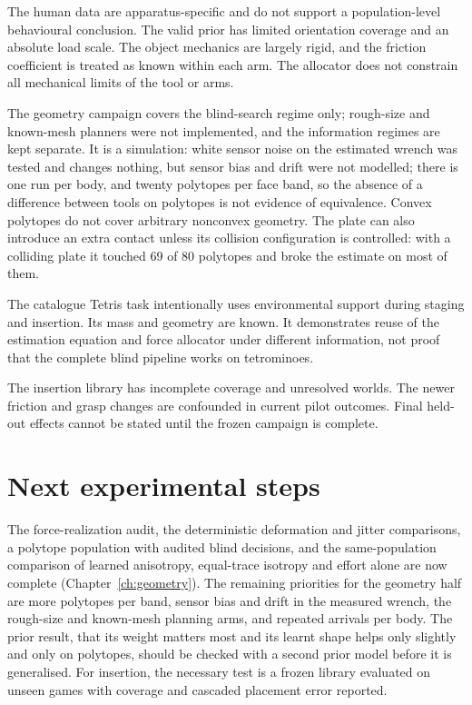 The human data are apparatus-specific and do not support a population-level behavioural conclusion. The valid prior has limited orientation coverage and an absolute load scale. The object mechanics are largely rigid, and the friction coefficient is treated as known within each arm. The allocator does not constrain all mechanical limits of the tool or arms.

The geometry campaign covers the blind-search regime only; rough-size and known-mesh planners were not implemented, and the information regimes are kept separate. It is a simulation: white sensor noise on the estimated wrench was tested and changes nothing, but sensor bias and drift were not modelled; there is one run per body, and twenty polytopes per face band, so the absence of a difference between tools on polytopes is not evidence of equivalence. Convex polytopes do not cover arbitrary nonconvex geometry. The plate can also introduce an extra contact unless its collision configuration is controlled: with a colliding plate it touched 69 of 80 polytopes and broke the estimate on most of them.

The catalogue Tetris task intentionally uses environmental support during staging and insertion. Its mass and geometry are known. It demonstrates reuse of the estimation equation and force allocator under different information, not proof that the complete blind pipeline works on tetrominoes.

The insertion library has incomplete coverage and unresolved worlds. The newer friction and grasp changes are confounded in current pilot outcomes. Final held-out effects cannot be stated until the frozen campaign is complete.

\section{Next experimental steps}

The force-realization audit, the deterministic deformation and jitter comparisons, a polytope population with audited blind decisions, and the same-population comparison of learned anisotropy, equal-trace isotropy and effort alone are now complete (Chapter~\ref{ch:geometry}). The remaining priorities for the geometry half are more polytopes per band, sensor bias and drift in the measured wrench, the rough-size and known-mesh planning arms, and repeated arrivals per body. The prior result, that its weight matters most and its learnt shape helps only slightly and only on polytopes, should be checked with a second prior model before it is generalised. For insertion, the necessary test is a frozen library evaluated on unseen games with coverage and cascaded placement error reported.

